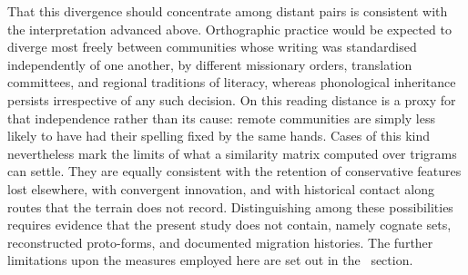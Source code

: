 That this divergence should concentrate among distant pairs is consistent with
the interpretation advanced above. Orthographic practice would be expected to
diverge most freely between communities whose writing was standardised
independently of one another, by different missionary orders, translation
committees, and regional traditions of literacy, whereas phonological
inheritance persists irrespective of any such decision. On this reading distance
is a proxy for that independence rather than its cause: remote communities are
simply less likely to have had their spelling fixed by the same hands. Cases of
this kind nevertheless mark the limits of what a similarity matrix computed over
trigrams can settle. They are equally consistent with the retention of
conservative features lost elsewhere, with convergent innovation, and with
historical contact along routes that the terrain does not record.
Distinguishing among these possibilities requires evidence that the present
study does not contain, namely cognate sets, reconstructed proto-forms, and
documented migration histories. The further limitations upon the measures
employed here are set out in the~ section.
